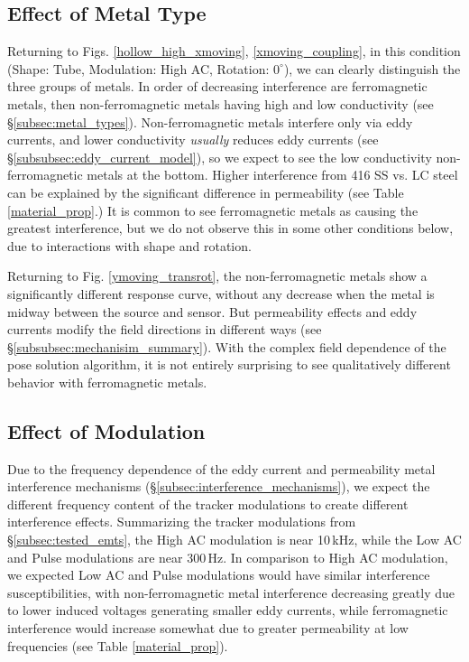 \documentclass[journal,twoside,web]{ieeecolor}
\begin{document}
\subsection{Effect of Metal Type}
Returning to Figs. \ref{hollow_high_xmoving}, \ref{xmoving_coupling}, in this condition (Shape: Tube, Modulation: High AC, Rotation: $0^\circ$), we can clearly distinguish the three groups of metals. In order of decreasing interference are ferromagnetic metals, then non-ferromagnetic metals having high and low conductivity (see \S\ref{subsec:metal_types}). Non-ferromagnetic metals interfere only via eddy currents, and lower conductivity \textit{usually} reduces eddy currents (see \S\ref{subsubsec:eddy_current_model}), so we expect to see the low conductivity non-ferromagnetic metals at the bottom. Higher interference from 416 SS vs. LC steel can be explained by the significant difference in permeability (see Table \ref{material_prop}.) It is common to see ferromagnetic metals as causing the greatest interference, but we do not observe this in some other conditions below, due to interactions with shape and rotation. 

Returning to Fig. \ref{ymoving_transrot}, the non-ferromagnetic metals show a significantly different response curve, without any decrease when the metal is midway between the source and sensor. But permeability effects and eddy currents modify the field directions in different ways (see \S\ref{subsubsec:mechanisim_summary}). With the complex field dependence of the pose solution algorithm, it is not entirely surprising to see qualitatively different behavior with ferromagnetic metals.

\subsection{Effect of Modulation}

Due to the frequency dependence of the eddy current and permeability metal interference mechanisms (\S\ref{subsec:interference_mechanisms}), we expect the different frequency content of the tracker modulations to create different interference effects. Summarizing the tracker modulations from \S\ref{subsec:tested_emts}, the High AC modulation is near 10\,kHz, while the Low AC and Pulse modulations are near 300\,Hz. In comparison to High AC modulation, we expected Low AC and Pulse modulations would have similar interference susceptibilities, with non-ferromagnetic metal interference decreasing greatly due to lower induced voltages generating smaller eddy currents, while ferromagnetic interference would increase somewhat due to greater permeability at low frequencies (see Table \ref{material_prop}).
\end{document}

